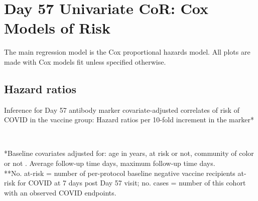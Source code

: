 \documentclass[
]{article}
\author{}
\date{\vspace{-2.5em}}
\begin{document}
{
\setcounter{tocdepth}{2}
\tableofcontents
}
\newcommand{\studyname}{mock}

\newcommand{\pathCoRoutput}{cor_coxph/output/D57}

\hypertarget{cor-coxph}{%
\section{Day 57 Univariate CoR: Cox Models of Risk}\label{cor-coxph}}

The main regression model is the Cox proportional hazards model. All plots are made with Cox models fit unless specified otherwise.

\hypertarget{hazard-ratios}{%
\subsection{Hazard ratios}\label{hazard-ratios}}

\begin{table}[H]
\caption{Inference for Day 57 antibody marker covariate-adjusted correlates of risk of COVID in the vaccine group: Hazard ratios per 10-fold increment in the marker*}
\begin{center}
    \\
\end{center}
*Baseline covariates adjusted for: age in years, at risk or not, community of color or not
. Average follow-up time  days, maximum follow-up time  days.\\
**No. at-risk = number of per-protocol baseline negative vaccine recipients at-risk for COVID at 7 days post Day 57 visit; no. cases = number of this cohort with an observed COVID endpoints.

    \label{tab:CoR_univariable_svycoxph_pretty_mock}
\end{table}
\end{document}
